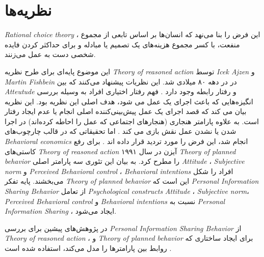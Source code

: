 \fi
\section{نظریه‌ها}
\textit{
  \gls{Rational choice theory}
}
،
این فرض را بنا می‌نهد که انسان‌ها بر اساس
تابعی از مجموع منفعت، با کسر مجموع هزینه‌های یک تصمیم
یا مبادله و برای حداکثر کردن فایده  شخصی دست به عمل می‌زنند.

این موضوع پایه‌ای برای طرح نظریه
\textit{
  \gls{Theory of reasoned action}
}
توسط
\textit{
  \gls{Icek Ajzen}
}
و
\textit{
  \gls{Martin Fishbein}
}
در در دهه ۸۰ میلادی شد. این نظریات پیشنهاد می‌کنند که بین
\textit{
  \gls{Atteutude}
}
و رفتار رابطه وجود دارد
.
فهم رفتار اختیاری افراد به وسیله
بررسی انگیزه‌هایی که باعث اجرای یک عمل می شود، هدف اصلی این نظریه بود. این نظریه
بیان می کند که قصد اجرای یک عمل پیش‌بینی‌کننده اصلی انجام یا عدم ایجاد رفتار  است. به
علاوه پارامتر هنجاری
(هنجارهای اجتماعی که عمل را احاطه کرده‌اند)
در اجرا شدن یا نشدن عمل نقش بازی می کند
.
اما تحقیقاتی که در قالب چارچوب‌های
\textit{
  \gls{Behavioral economics}
}
انجام شد، این فرض را مورد تردید قرار داده اند
\!\cite{henrichEconomicManCrosscultural2005}.
برای رفع کاستی‌های
\textit{
  \gls{Theory of reasoned action}
}
آیزن در سال ۱۹۹۱ 
\!\citep{ajzenTheoryPlannedBehavior1991}
\textit{
  \gls{Theory of planned behavior}
}
را مطرح کرد. به بیان این تئوری سه پارامتر اصلی
\textit{
  \gls{Attitude}
}
\!،
\textit{\gls{Subjective norm}}
و
\textit{\gls{Perceived Behavioral control}}
\!،
\textit{\glspl{Behavioral intention}}
افراد را شکل می‌بخشند. پایه تفکر
\textit{
  \gls{Theory of planned behavior}
}
این است که
\textit{
  \gls{Personal Information Sharing Behavior}
}
از تعامل
\textit{\glspl{Psychological construct}}
\textit{
  \gls{Attitude}
}
\!،
\textit{\gls{Subjective norm}}،
\textit{\gls{Perceived Behavioral control}}
و
\textit{\glspl{Behavioral intention}}
نسبت به 
\textit{
  \gls{Personal Information Sharing}
}،
ایجاد می‌شود. 

در پژوهش‌های پیشین برای بررسی
\textit{
  \gls{Personal Information Sharing Behavior}
}
از
\textit{
  \gls{Theory of reasoned action}
}
\!\citep{malhotraInternetUsersInformation2004}،
و
\textit{
  \gls{Theory of planned behavior}
}
برای ایجاد ساختاری که روابط بین پارامترها را مدل می‌کند، استفاده شده است
\!\citep{dinevExtendedPrivacyCalculus2006b}.

